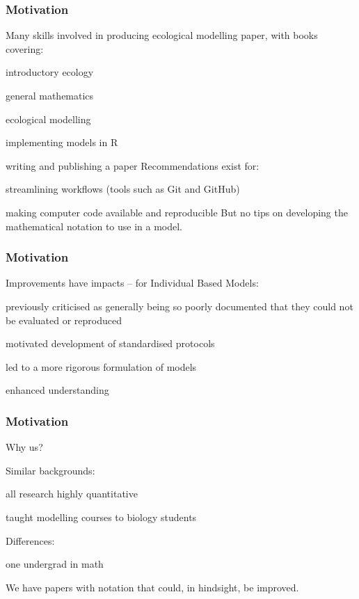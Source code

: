 
\begin{frame}
\frametitle{Motivation}
Many skills involved in producing ecological modelling paper, with books covering:
\bi
\item introductory ecology
\item general mathematics
\item ecological modelling
\item implementing models in R
\item writing and publishing a paper
\ei
  Recommendations exist for:
\bi
\item streamlining workflows (tools such as Git and GitHub)
\item making computer code available and reproducible
\ei
But no tips on developing the mathematical notation to use in a model.

\end{frame}


\begin{frame}
\frametitle{Motivation}

Improvements have impacts -- for Individual Based Models:

\bi
\item previously criticised as generally being so poorly documented
that they could not be evaluated or reproduced
\item motivated development of standardised protocols
\item led to a more rigorous formulation of models
\item enhanced understanding
\ei
\end{frame}


\begin{frame}
\frametitle{Motivation}

Why us?

\medskip

Similar backgrounds:
\bi
\item all research highly quantitative
\item {}
\item taught modelling courses to biology students
\ei

\medskip
Differences:
\bi
\item one undergrad in math
\item {}
\ei

\medskip

We have papers with notation that could, in hindsight, be improved.

\end{frame}


